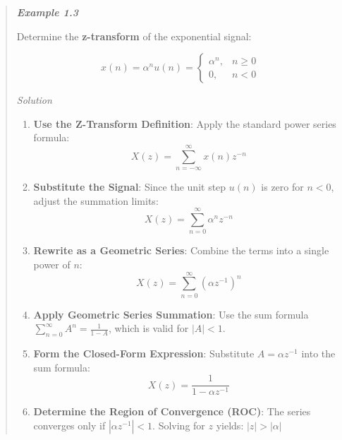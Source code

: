 \begin{quote}
\textbf{\emph{Example 1.3}}

Determine the \textbf{z-transform} of the exponential signal:

\[
x(n) = \alpha^n u(n) =
\begin{cases}
\alpha^n, & n \ge 0 \\
0, & n < 0 
\end{cases}
\]

\emph{Solution}

\begin{enumerate}
\def\labelenumi{\arabic{enumi}.}
\tightlist
\item
  \textbf{Use the Z-Transform Definition}: Apply the standard power
  series formula: \[X(z) = \sum_{n=-\infty}^{\infty} x(n)z^{-n}\]
\item
  \textbf{Substitute the Signal}: Since the unit step \(u(n)\) is zero
  for \(n < 0\), adjust the summation limits:
  \[X(z) = \sum_{n=0}^{\infty} \alpha^n z^{-n}\]
\item
  \textbf{Rewrite as a Geometric Series}: Combine the terms into a
  single power of \(n\):
  \[X(z) = \sum_{n=0}^{\infty} (\alpha z^{-1})^n\]
\item
  \textbf{Apply Geometric Series Summation}: Use the sum formula
  \(\sum_{n=0}^{\infty} A^n = \frac{1}{1-A}\), which is valid for
  \(|A| < 1\).
\item
  \textbf{Form the Closed-Form Expression}: Substitute
  \(A = \alpha z^{-1}\) into the sum formula:
  \textbf{\[X(z) = \frac{1}{1 - \alpha z^{-1}}\]}
\item
  \textbf{Determine the Region of Convergence (ROC)}: The series
  converges only if \(|\alpha z^{-1}| < 1\). Solving for \(z\) yields:
  \textbf{\(|z| > |\alpha|\)}
\end{enumerate}
\end{quote}

